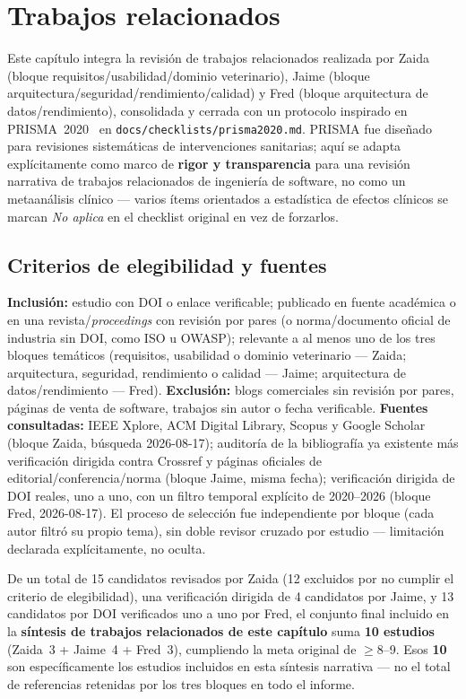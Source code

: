 \chapter{Trabajos relacionados}
\label{cap:trabajos-relacionados}

Este cap\'itulo integra la revisi\'on de trabajos relacionados realizada por
Zaida (bloque requisitos/usabilidad/dominio veterinario), Jaime (bloque
arquitectura/seguridad/rendimiento/calidad) y Fred (bloque arquitectura de
datos/rendimiento), consolidada y cerrada con un protocolo inspirado en
PRISMA~2020~\cite{page2021prisma} en \texttt{docs/checklists/prisma2020.md}.
PRISMA fue dise\~nado para revisiones sistem\'aticas de intervenciones
sanitarias; aqu\'i se adapta expl\'icitamente como marco de \textbf{rigor y
transparencia} para una revisi\'on narrativa de trabajos relacionados de
ingenier\'ia de software, no como un metaan\'alisis cl\'inico --- varios
\'items orientados a estad\'istica de efectos cl\'inicos se marcan
\emph{No aplica} en el checklist original en vez de forzarlos.

\section{Criterios de elegibilidad y fuentes}

\textbf{Inclusi\'on:} estudio con DOI o enlace verificable; publicado en
fuente acad\'emica o en una revista/\emph{proceedings} con revisi\'on por
pares (o norma/documento oficial de industria sin DOI, como ISO u OWASP);
relevante a al menos uno de los tres bloques tem\'aticos (requisitos,
usabilidad o dominio veterinario --- Zaida; arquitectura, seguridad,
rendimiento o calidad --- Jaime; arquitectura de datos/rendimiento ---
Fred). \textbf{Exclusi\'on:} blogs comerciales sin revisi\'on por pares,
p\'aginas de venta de software, trabajos sin autor o fecha verificable.
\textbf{Fuentes consultadas:} IEEE Xplore, ACM Digital Library, Scopus y
Google Scholar (bloque Zaida, b\'usqueda 2026-08-17); auditor\'ia de la
bibliograf\'ia ya existente m\'as verificaci\'on dirigida contra Crossref y
p\'aginas oficiales de editorial/conferencia/norma (bloque Jaime, misma
fecha); verificaci\'on dirigida de DOI reales, uno a uno, con un filtro
temporal expl\'icito de 2020--2026 (bloque Fred, 2026-08-17). El proceso de
selecci\'on fue independiente por bloque (cada autor filtr\'o su propio
tema), sin doble revisor cruzado por estudio --- limitaci\'on declarada
expl\'icitamente, no oculta.

De un total de 15 candidatos revisados por Zaida (12 excluidos por no
cumplir el criterio de elegibilidad), una verificaci\'on dirigida de 4
candidatos por Jaime, y 13 candidatos por DOI verificados uno a uno por
Fred, el conjunto final incluido en la \textbf{s\'intesis de trabajos
relacionados de este cap\'itulo} suma \textbf{10 estudios} (Zaida~3 +
Jaime~4 + Fred~3), cumpliendo la meta original de $\geq$8--9. Esos
\textbf{10} son espec\'ificamente los estudios incluidos en esta
s\'intesis narrativa --- no el total de referencias retenidas por los
tres bloques en todo el informe.

